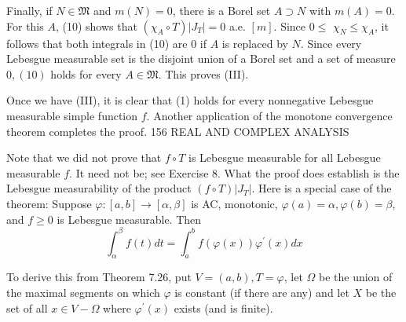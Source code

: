 Finally, if $N \in \mathfrak{M}$ and $m(N)=0$, there is a Borel set $A \supset N$ with $m(A)=0$. For this $A$, (10) shows that $\left(\chi_A \circ T\right)\left|J_T\right|=0$ a.e. $[m]$. Since $0 \leq$ $\chi_N \leq \chi_A$, it follows that both integrals in (10) are 0 if $A$ is replaced by $N$. Since every Lebesgue measurable set is the disjoint union of a Borel set and a set of measure $0,(10)$ holds for every $A \in \mathfrak{M}$. This proves (III).

Once we have (III), it is clear that (1) holds for every nonnegative Lebesgue measurable simple function $f$. Another application of the monotone convergence theorem completes the proof.
156 REAL AND COMPLEX ANALYSIS

Note that we did not prove that $f \circ T$ is Lebesgue measurable for all Lebesgue measurable $f$. It need not be; see Exercise 8. What the proof does establish is the Lebesgue measurability of the product $(f \circ T)\left|J_T\right|$.
Here is a special case of the theorem:
Suppose $\varphi:[a, b] \rightarrow[\alpha, \beta]$ is AC, monotonic, $\varphi(a)=\alpha, \varphi(b)=\beta$, and $f \geq 0$ is Lebesgue measurable. Then
$$
\int_\alpha^\beta f(t) d t=\int_a^b f(\varphi(x)) \varphi^{\prime}(x) d x
$$

To derive this from Theorem 7.26, put $V=(a, b), T=\varphi$, let $\Omega$ be the union of the maximal segments on which $\varphi$ is constant (if there are any) and let $X$ be the set of all $x \in V-\Omega$ where $\varphi^{\prime}(x)$ exists (and is finite).